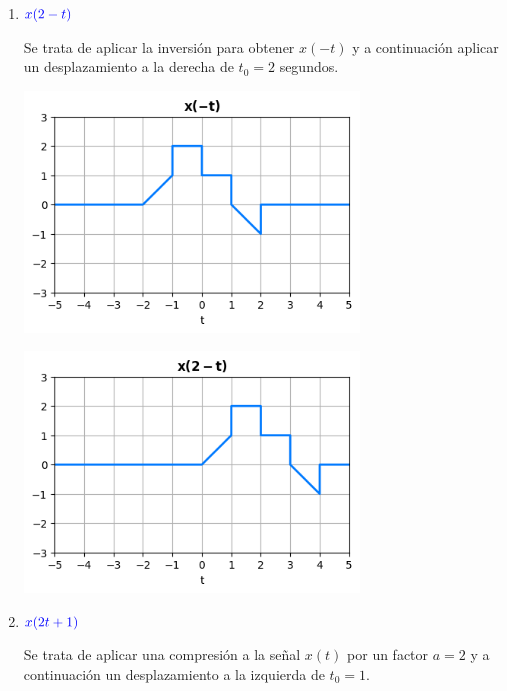 \begin{enumerate}[label=\color{red}\textbf{\arabic*)}, leftmargin=*]
\begin{enumerate}[label=\color{red}\alph*)]
			\item $\textcolor{blue}{x(2-t)}$
			
			Se trata de aplicar la inversión para obtener $x(-t)$ y a continuación aplicar un desplazamiento a la derecha de $t_0=2$ segundos.
			
			\begin{center}
			\includegraphics[width=0.7\textwidth]{"Temas/Tema 1/screenshot004.png"}
			\end{center}
			
			\begin{center}
			\includegraphics[width=0.7\textwidth]{"Temas/Tema 1/screenshot005.png"}
			\end{center}
			
			\item $\textcolor{blue}{x(2t+1)}$
			
			Se trata de aplicar una compresión a la señal $x(t)$ por un factor $a=2$ y a continuación un desplazamiento a la izquierda de $t_0=1$.
			

\end{enumerate}
\end{enumerate}
